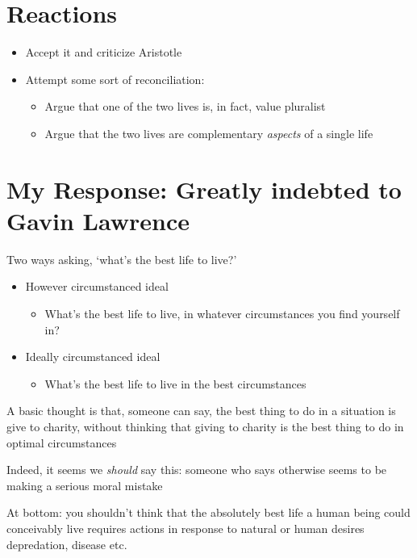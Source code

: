 \documentclass[11pt]{article}
\begin{document}
\section{Reactions}

\begin{itemize}\item{Accept it and criticize Aristotle}\item{Attempt some sort of reconciliation:}\begin{itemize}\item{Argue that one of the two lives is, in fact, value pluralist}\item{Argue that the two lives are complementary \emph{aspects} of a single life}\end{itemize}\end{itemize}

\section{My Response: Greatly indebted to Gavin Lawrence}

\noindent Two ways asking, `what's the best life to live?'

\begin{itemize}\item{However circumstanced ideal}\begin{itemize}\item{What's the best life to live, in whatever circumstances you find yourself in?}\end{itemize}\item{Ideally circumstanced ideal}\begin{itemize}\item{What's the best life to live in the best circumstances}\end{itemize}\end{itemize}

\noindent A basic thought is that, someone can say, the best thing to do in a situation is give to charity, without thinking that giving to charity is the best thing to do in optimal circumstances
\vspace*{2mm}

\noindent Indeed, it seems we \emph{should} say this: someone who says otherwise seems to be making a serious moral mistake
\vspace*{2mm}

\noindent At bottom: you shouldn't think that the absolutely best life a human being could conceivably live requires actions in response to natural or human desires depredation, disease etc.
\vspace*{2mm}
\end{document}
